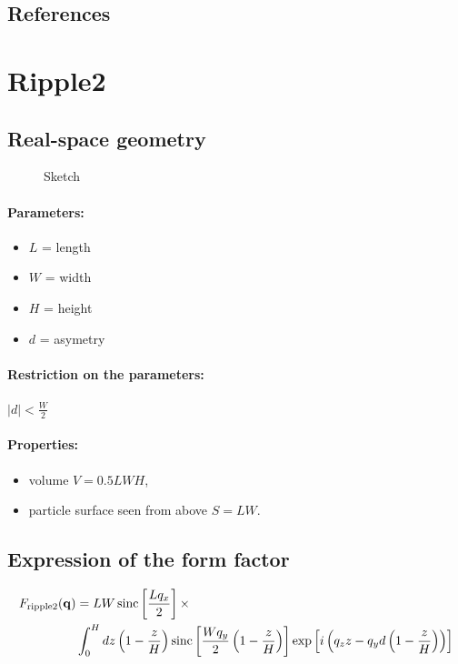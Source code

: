 \subsection{References}


\newpage{\cleardoublepage}
\section{Ripple2}   

\subsection{Real-space geometry}


\begin{figure}[ht]
\begin{center}
\caption{Sketch}
\end{center}
\end{figure}

\paragraph{Parameters:}
\begin{itemize}
\item $L$ = length 
\item $W$ = width 
\item $H$ = height
\item $d$ = asymetry 
\end{itemize}

\paragraph{Restriction on the parameters:} $|d| < \frac{W}{2} $

\paragraph{Properties:}
\begin{itemize}
\item volume $V = 0.5 L W H$,
\item particle surface seen from above $S = L W$.
\end{itemize}

\subsection{Expression of the form factor}
\begin{align*}
F_{\rm{ripple2}}(\mathbf{q}) &=L W \operatorname{sinc}\left[\frac{Lq_x}{2}\right]\times \\ &\int_0^H{dz \left(1-\frac{z}{H}\right)\operatorname{sinc}\left[\frac{Wq_y}{2}\left(1-\frac{z}{H}\right)\right]\exp\left[i\left(q_zz - q_yd\left(1-\frac{z}{H}\right)\right)\right]}
\end{align*}

